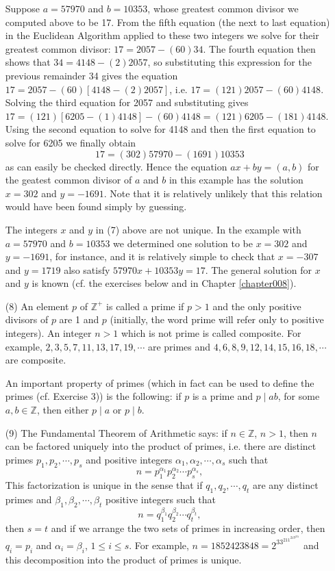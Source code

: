 \documentclass[cn,11pt,chinese]{elegantbook}
\numberwithin{equation}{section}
\begin{document}
\begin{enumerate}
\begin{example}
Suppose $a = 57970$ and $b=10353$, whose greatest common divisor we computed above to be 17. From the fifth equation (the next to last equation) in the Euclidean Algorithm applied to these two integers we solve for their greatest common divisor: $17 = 2057 - (60)34$. The fourth equation then shows that $34 = 4148 - (2)2057$, so substituting this expression for the previous remainder 34 gives the equation $17 = 2057 - (60)[4148 - (2)2057]$, i.e. $17 = (121)2057 - (60)4148$. Solving the third equation for 2057 and substituting gives $17 = (121)[6205 - (1)4148] - (60)4148 = (121)6205 - (181)4148$. Using the second equation to solve for 4148 and then the first equation to solve for 6205 we finally obtain
\[
17 = (302)57970 - (1691)10353
\]
as can easily be checked directly. Hence the equation $ax + by = (a, b)$ for the geatest common divisor of $a$ and $b$ in this example has the solution $x = 302$ and $y=-1691$. Note that it is relatively unlikely that this relation would have been found simply by guessing.
\end{example}

The integers $x$ and $y$ in (7) above are not unique. In the example with $a = 57970$ and $b = 10353$ we determined one solution to be $x = 302$ and $y = -1691$, for instance, and it is relatively simple to check that $x = -307$ and $y = 1719$ also satisfy $57970x + 10353y=17$. The general solution for $x$ and $y$ is known (cf. the exercises below and in Chapter \ref{chapter008}).

\item[(8)] An element $p$ of $\mathbb{Z}^+$ is called a prime if $p > 1$ and the only positive divisors of $p$ are 1 and $p$ (initially, the word prime will refer only to positive integers). An integer $n > 1$ which is not prime is called composite. For example, $2,3,5,7,11,13,17,19, \cdots$ are primes and $4,6,8,9,12,14,15,16,18, \cdots$ are composite.

An important property of primes (which in fact can be used to define the primes (cf. Exercise 3)) is the following: if $p$ is a prime and $p \mid ab$, for some $a, b \in \mathbb{Z}$, then either $p \mid a$ or $p \mid b$.

\item[(9)] The Fundamental Theorem of Arithmetic says: if $n \in \mathbb{Z}$, $n > 1$, then $n$ can be factored uniquely into the product of primes, i.e. there are distinct primes $p_1, p_2, \cdots, p_s$ and positive integers $\alpha_1, \alpha_2, \cdots, \alpha_s$ such that
\[
n = p_1^{\alpha_1}p_2^{\alpha_2}\cdots{}p_s^{\alpha_s},
\]
This factorization is unique in the sense that if $q_1, q_2, \cdots, q_t$ are any distinct primes and $\beta_1, \beta_2, \cdots, \beta_t$ positive integers such that
\[
n = q_1^{\beta_1}q_2^{\beta_2}\cdots{}q_t^{\beta_t},
\]
then $s=t$ and if we arrange the two sets of primes in increasing order, then $q_i = p_i$ and $\alpha_i = \beta_i$, $1 \le i \le s$. For example, $n = 1852423848 = 2^33^211^219^331$ and this decomposition into the product of primes is unique.


\end{enumerate}
\end{document}
